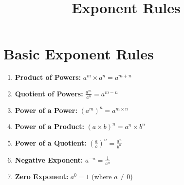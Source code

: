 \documentclass{article}
\title{Exponent Rules}
\author{}
\date{}
\begin{document}
\maketitle

\section*{Basic Exponent Rules}

\begin{enumerate}
    \item \textbf{Product of Powers:} $a^m \times a^n = a^{m+n}$
    \item \textbf{Quotient of Powers:} $\frac{a^m}{a^n} = a^{m-n}$
    \item \textbf{Power of a Power:} $(a^m)^n = a^{m \times n}$
    \item \textbf{Power of a Product:} $(a \times b)^n = a^n \times b^n$
    \item \textbf{Power of a Quotient:} $\left(\frac{a}{b}\right)^n = \frac{a^n}{b^n}$
    \item \textbf{Negative Exponent:} $a^{-n} = \frac{1}{a^n}$
    \item \textbf{Zero Exponent:} $a^0 = 1$ (where $a \neq 0$)
\end{enumerate}
\end{document}
